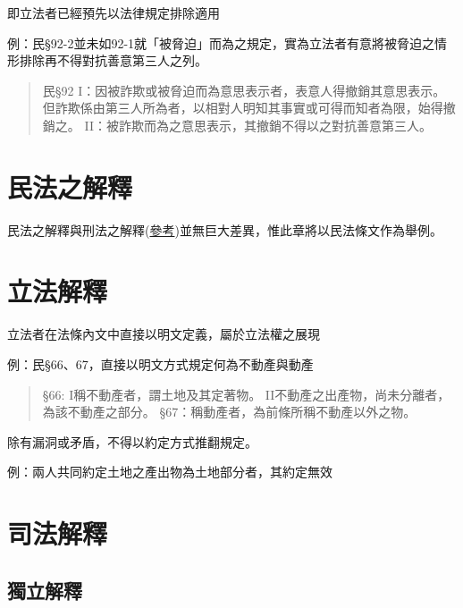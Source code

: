 \documentclass[
]{book}
\begin{document}
即立法者已經預先以法律規定排除適用

例：民§92-2並未如92-1就「被脅迫」而為之規定，實為立法者有意將被脅迫之情形排除再不得對抗善意第三人之列。

\begin{quote}
民§92
I：因被詐欺或被脅迫而為意思表示者，表意人得撤銷其意思表示。但詐欺係由第三人所為者，以相對人明知其事實或可得而知者為限，始得撤銷之。
II：被詐欺而為之意思表示，其撤銷不得以之對抗善意第三人。
\end{quote}

\pagebreak

\hypertarget{ux6c11ux6cd5ux4e4bux89e3ux91cb}{%
\section*{民法之解釋}\label{ux6c11ux6cd5ux4e4bux89e3ux91cb}}

民法之解釋與刑法之解釋(\href{https://criminal.lsyverycute.com/司法解釋1.html}{參考})並無巨大差異，惟此章將以民法條文作為舉例。

\hypertarget{ux7acbux6cd5ux89e3ux91cb}{%
\section{立法解釋}\label{ux7acbux6cd5ux89e3ux91cb}}

立法者在法條內文中直接以明文定義，屬於立法權之展現

例：民§66、67，直接以明文方式規定何為不動產與動產

\begin{quote}
§66:
I稱不動產者，謂土地及其定著物。
II不動產之出產物，尚未分離者，為該不動產之部分。
§67：稱動產者，為前條所稱不動產以外之物。
\end{quote}

除有漏洞或矛盾，不得以約定方式推翻規定。

例：兩人共同約定土地之產出物為土地部分者，其約定無效

\hypertarget{ux53f8ux6cd5ux89e3ux91cb}{%
\section{司法解釋}\label{ux53f8ux6cd5ux89e3ux91cb}}

\hypertarget{ux7368ux7acbux89e3ux91cb}{%
\subsection{獨立解釋}\label{ux7368ux7acbux89e3ux91cb}}
\end{document}

